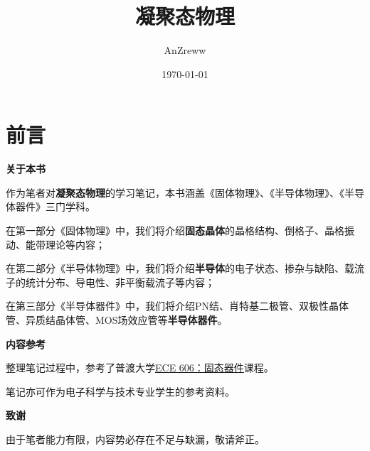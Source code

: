 \documentclass[12pt,oneside,a4paper]{book}
\title{凝聚态物理}
\author{AnZreww}
\date{\today}
\begin{document}
\maketitle          %

\frontmatter
\chapter{前言}
\textbf{关于本书}

作为笔者对\textbf{凝聚态物理}的学习笔记，本书涵盖《固体物理》、《半导体物理》、《半导体器件》三门学科。

在第一部分《固体物理》中，我们将介绍\textbf{固态晶体}的晶格结构、倒格子、晶格振动、能带理论等内容；

在第二部分《半导体物理》中，我们将介绍\textbf{半导体}的电子状态、掺杂与缺陷、载流子的统计分布、导电性、非平衡载流子等内容；

在第三部分《半导体器件》中，我们将介绍PN结、肖特基二极管、双极性晶体管、异质结晶体管、MOS场效应管等\textbf{半导体器件}。

\hspace{2em}

\textbf{内容参考}

整理笔记过程中，参考了普渡大学\href{https://nanohub.org/courses/ECE606/2020x/outline}{ECE 606：固态器件}课程。

笔记亦可作为电子科学与技术专业学生的参考资料。

\hspace{2em}

\textbf{致谢}

由于笔者能力有限，内容势必存在不足与缺漏，敬请斧正。

\tableofcontents    %

\mainmatter







\backmatter
\end{document}
